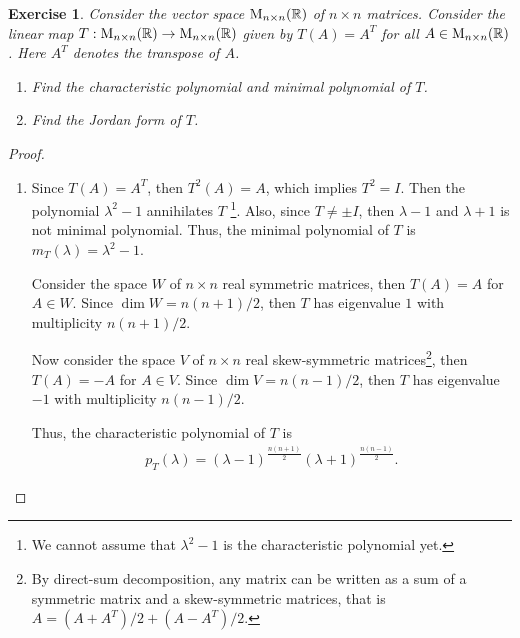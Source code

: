 \documentclass[11pt]{article}
\newtheorem{exercise}{Exercise}[section]
\theoremstyle{definition}
\numberwithin{equation}{subsection}
\begin{document}
\begin{exercise}{\rm *}
Consider the vector space ${\rm M}_{n\times n}(\mathbb{R})$ of $n \times n$ matrices. Consider the linear map $T: {\rm M}_{n\times n}(\mathbb{R}) \to {\rm M}_{n\times n}(\mathbb{R})$ given by $T(A) = A^T$ for all $A \in {\rm M}_{n\times n}(\mathbb{R})$. Here $A^T$ denotes the transpose of $A$.
\begin{enumerate}[label=(\alph*)]
    \item Find the characteristic polynomial and minimal polynomial of $T$.
    
    \item Find the Jordan form of $T$.
\end{enumerate}
\end{exercise}
\begin{proof}
~\begin{enumerate}[label=(\alph*)]
    \item Since $T(A) = A^T$, then $T^2(A) = A$, which implies $T^2 = I$. Then the polynomial $\lambda^2 - 1$ annihilates $T$ \footnote{We cannot assume that $\lambda^2 - 1$ is the characteristic polynomial yet.}. Also, since $T \neq \pm I$, then $\lambda - 1$ and $\lambda + 1$ is not minimal polynomial. Thus, the minimal polynomial of $T$ is $m_T(\lambda) = \lambda^2 - 1$.
    
    Consider the space $W$ of $n \times n$ real symmetric matrices, then $T(A) = A$ for $A \in W$. Since $\dim W = n(n+1)/2$, then $T$ has eigenvalue $1$ with multiplicity $n(n+1)/2$. 
    
    Now consider the space $V$ of $n \times n$ real skew-symmetric matrices\footnote{By direct-sum decomposition, any matrix can be written as a sum of a symmetric matrix and a skew-symmetric matrices, that is $A = (A + A^T)/2 + (A - A^T)/2$.}, then $T(A) = -A$ for $A \in V$. Since $\dim V = n(n-1)/2$, then $T$ has eigenvalue $-1$ with multiplicity $n(n-1)/2$. 
    
    Thus, the characteristic polynomial of $T$ is 
    \begin{align*}
        p_T(\lambda) = (\lambda - 1)^{\frac{n(n+1)}{2}} (\lambda + 1)^{\frac{n(n-1)}{2}}.
    \end{align*}
    

\end{enumerate}
\end{proof}
\end{document}
